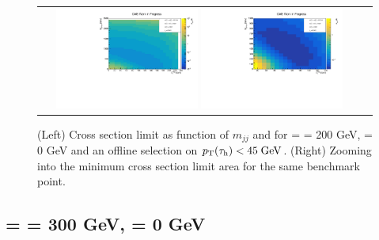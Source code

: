 \begin{figure}[tbh!]
	\centering
	\begin{tabular}{cc}
		\includegraphics[width=0.45\textwidth]{analysis/pics/JetInvMass_vs_MET_xsec_chi200_lsp000_taupt45.pdf}
		\includegraphics[width=0.45\textwidth]{analysis/pics/JetInvMass_vs_MET_xsec_chi200_lsp000_taupt45_zoom.pdf}
	\end{tabular}
	\caption{(Left) Cross section limit as function of $m_{jj}$ and \met for \charginopm = \neutralinotwo = 200 GeV, \neutralinoone = 0 GeV and an offline selection on $p_{\text{T}}(\tau_{\text{h}}) <  45\;\text{Ge}\kern-0.06667em\text{V}$. (Right) Zooming into the minimum cross section limit area for the same benchmark point.}
	\label{fig::JetInvMass_vs_MET_xsec_chi200_lsp000_taupt45}
\end{figure}

\FloatBarrier

\subsection*{\charginopm = \neutralinotwo = 300 GeV, \neutralinoone = 0 GeV}

\FloatBarrier

